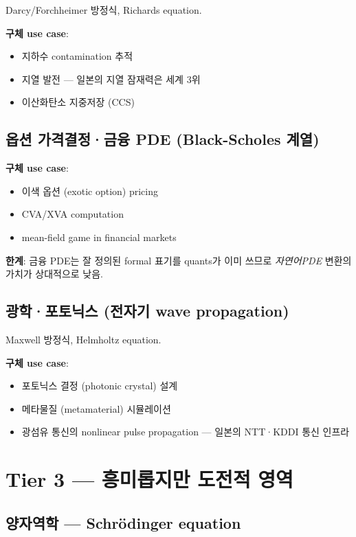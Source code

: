 \documentclass[11pt,a4paper,oneside]{report}
\begin{document}
Darcy/Forchheimer 방정식, Richards equation.

\textbf{구체 use case}:
\begin{itemize}
\item 지하수 contamination 추적
\item 지열 발전 --- 일본의 지열 잠재력은 세계 3위
\item 이산화탄소 지중저장 (CCS)
\end{itemize}

\subsection{옵션 가격결정·금융 PDE (Black-Scholes 계열)}

\textbf{구체 use case}:
\begin{itemize}
\item 이색 옵션 (exotic option) pricing
\item CVA/XVA computation
\item mean-field game in financial markets
\end{itemize}

\textbf{한계}: 금융 PDE는 잘 정의된 formal 표기를 quants가 이미 쓰므로 \textit{자연어\textrightarrow{}PDE} 변환의 가치가 상대적으로 낮음.

\subsection{광학·포토닉스 (전자기 wave propagation)}

Maxwell 방정식, Helmholtz equation.

\textbf{구체 use case}:
\begin{itemize}
\item 포토닉스 결정 (photonic crystal) 설계
\item 메타물질 (metamaterial) 시뮬레이션
\item 광섬유 통신의 nonlinear pulse propagation --- 일본의 NTT·KDDI 통신 인프라
\end{itemize}

\section{Tier 3 --- 흥미롭지만 도전적 영역}

\subsection{양자역학 --- Schr\"{o}dinger equation}
\end{document}
